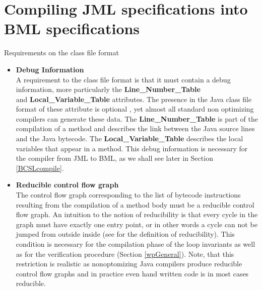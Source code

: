 \documentclass[a4paper]{llncs}
\begin{document}
\section{Compiling JML specifications into BML specifications}
Requirements on the class file format
\begin{itemize}
  \item \textbf{Debug Information} \\ A requirement to the class file
  format is that it must contain a debug information, more
  particularly the \textbf{Line\_Number\_Table} \\ and
  \textbf{Local\_Variable\_Table} attributes. The presence in the Java
  class file format of these attribute is optional \cite{VMSpec}, yet
  almost all standard non optimizing compilers can generate these
  data. The \textbf{Line\_Number\_Table} is part of the compilation of
  a method and describes the link between the Java source lines and
  the Java bytecode.  The \textbf{Local\_Variable\_Table} describes
  the local variables that appear in a method.  This debug information
  is necessary for the compiler from JML to BML, as we shall see later
  in Section \ref{BCSLcompile}.

\item  \textbf{Reducible control flow graph} \\ 
       The control flow graph corresponding to the list of bytecode
       instructions resulting from the compilation of a method body
       must be a reducible control flow graph. An intuition to the
       notion of reducibility is that every cycle in the graph must
       have exactly one entry point, or in other words a cycle can not
       be jumped from outside inside (see \cite{ARUCom1986} for the
       definition of reducibility). This condition is necessary for
       the compilation phase of the loop invariants as well as for the
       verification procedure (Section \ref{wpGeneral}).  Note, that
       this restriction is realistic as nonoptomizing Java compilers
       produce reducible control flow graphs and in practice even hand
       written code is in most cases reducible.
\end{itemize}
\end{document}
